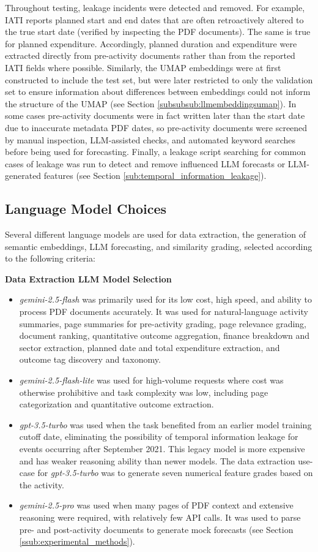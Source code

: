 \documentclass[12pt,a4paper]{article}
\begin{document}
Throughout testing, leakage incidents were detected and removed. For example, IATI reports planned start and end dates that are often retroactively altered to the true start date (verified by inspecting the PDF documents). The same is true for planned expenditure. Accordingly, planned duration and expenditure were extracted directly from pre-activity documents rather than from the reported IATI fields where possible. Similarly, the UMAP embeddings were at first constructed to include the test set, but were later restricted to only the validation set to ensure information about differences between embeddings could not inform the structure of the UMAP (see Section \ref{subsubsub:llmembeddingsumap}). In some cases pre-activity documents were in fact written later than the start date due to inaccurate metadata PDF dates, so pre-activity documents were screened by manual inspection, LLM-assisted checks, and automated keyword searches before being used for forecasting. Finally, a leakage script searching for common cases of leakage was run to detect and remove influenced LLM forecasts or LLM-generated features (see Section \ref{sub:temporal_information_leakage}).

\subsection{Language Model Choices}
Several different language models are used for data extraction, the generation of semantic embeddings, LLM forecasting, and similarity grading, selected according to the following criteria:

\textbf{Data Extraction LLM Model Selection}
\begin{itemize}
  \item \emph{gemini-2.5-flash} was primarily used for its low cost, high speed, and ability to process PDF documents accurately. It was used for natural-language activity summaries, page summaries for pre-activity grading, page relevance grading, document ranking, quantitative outcome aggregation, finance breakdown and sector extraction, planned date and total expenditure extraction, and outcome tag discovery and taxonomy.
  \item \emph{gemini-2.5-flash-lite} was used for high-volume requests where cost was otherwise prohibitive and task complexity was low, including page categorization and quantitative outcome extraction.
  \item \emph{gpt-3.5-turbo} was used when the task benefited from an earlier model training cutoff date, eliminating the possibility of temporal information leakage for events occurring after September 2021. This legacy model is more expensive and has weaker reasoning ability than newer models. The data extraction use-case for \emph{gpt-3.5-turbo} was to generate seven numerical feature grades based on the activity.
  \item \emph{gemini-2.5-pro} was used when many pages of PDF context and extensive reasoning were required, with relatively few API calls. It was used to parse pre- and post-activity documents to generate mock forecasts (see Section \ref{ssub:experimental_methods}).
\end{itemize}
\end{document}
